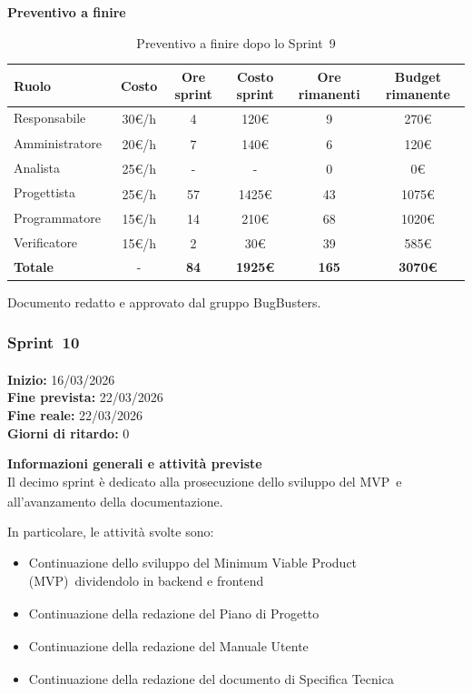 \documentclass[a4paper,12pt]{article}
\newcommand{\pediceG}{\texorpdfstring{\textsubscript{\scalebox{0.6}{\textbf{G}}}~}{G}}
\begin{document}
\newpage
\noindent\textbf{Preventivo a finire}
 
\begin{table}[H]
\centering
\footnotesize
\begin{tabular}{|l|c|c|c|c|c|}
\hline
Ruolo & Costo & Ore sprint & Costo sprint & Ore rimanenti & Budget rimanente \\
\hline
Responsabile\pediceG & 30€/h & 4 & 120€ & 9 & 270€ \\
\hline
Amministratore\pediceG & 20€/h & 7 & 140€ & 6 & 120€ \\
\hline
Analista\pediceG & 25€/h & - & - & 0 & 0€ \\
\hline
Progettista\pediceG & 25€/h & 57 & 1425€ & 43 & 1075€ \\
\hline
Programmatore\pediceG & 15€/h & 14 & 210€ & 68 & 1020€ \\
\hline
Verificatore\pediceG & 15€/h & 2 & 30€ & 39 & 585€ \\
\hline
\textbf{Totale} & - & \textbf{84} & \textbf{1925€} & \textbf{165} & \textbf{3070€} \\
\hline
\end{tabular}
\caption{Preventivo a finire dopo lo Sprint\pediceG 9}
\label{tab:risorse-sprint9}
\end{table}
 
\vfill
\begin{center}
    {\small\color{darkgray} Documento redatto e approvato dal gruppo BugBusters.}
\end{center}

\newpage
\subsubsection{Sprint\pediceG 10}

\textbf{Inizio:} 16/03/2026 \\
\textbf{Fine prevista:} 22/03/2026 \\
\textbf{Fine reale:} 22/03/2026 \\
\textbf{Giorni di ritardo:} 0
 
\noindent\textbf{Informazioni generali e attività previste}\\
Il decimo sprint è dedicato alla prosecuzione dello sviluppo del MVP\pediceG e all'avanzamento della documentazione.
 
In particolare, le attività svolte sono:
\begin{itemize}
\item Continuazione dello sviluppo del Minimum Viable Product (MVP)\pediceG dividendolo in backend e frontend
\item Continuazione della redazione del Piano di Progetto\pediceG
\item Continuazione della redazione del Manuale Utente\pediceG
\item Continuazione della redazione del documento di Specifica Tecnica\pediceG
  \end{itemize}
 
\end{document}
